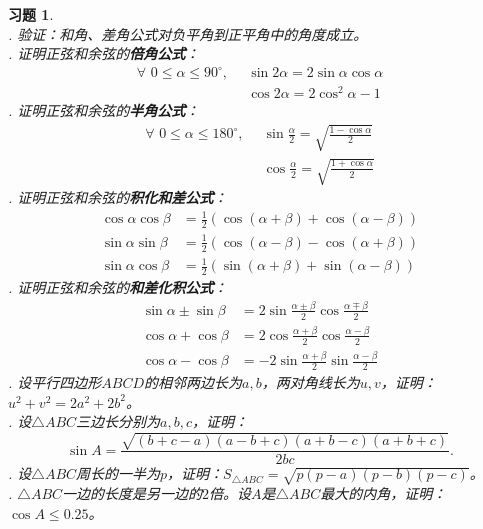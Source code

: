 \documentclass[12pt,UTF8]{ctexbook}
\newtheorem{xt}{习题}[section]
\begin{document}
\begin{xt}\label{xt:2-4-10}
    \mbox{} \\
    . 验证：和角、差角公式对负平角到正平角中的角度成立。 \\
    . 证明正弦和余弦的\textbf{倍角公式}：
    \begin{align*}
        \forall \,\, 0 \leqslant \alpha \leqslant 90^\circ , \,\,\, & \sin 2\alpha = 2\sin \alpha \cos \alpha  \\
        & \cos 2\alpha = 2\cos^2 \alpha - 1  
    \end{align*}
    . 证明正弦和余弦的\textbf{半角公式}：
    \begin{align*}
        \forall \,\, 0 \leqslant \alpha \leqslant 180^\circ , \,\,\, & \sin \frac{\alpha}{2} = \sqrt{\frac{1 - \cos \alpha}{2}}   \\
        & \cos \frac{\alpha}{2} = \sqrt{\frac{1 + \cos \alpha}{2}} 
    \end{align*}
    . 证明正弦和余弦的\textbf{积化和差公式}：
    \begin{align*}
        \cos \alpha \cos \beta &= \frac12 (\cos (\alpha + \beta) + \cos (\alpha - \beta))  \\
        \sin \alpha \sin \beta &= \frac12 (\cos (\alpha - \beta) - \cos (\alpha + \beta))  \\
        \sin \alpha \cos \beta &= \frac12 (\sin (\alpha + \beta) + \sin (\alpha - \beta))  
    \end{align*}
    . 证明正弦和余弦的\textbf{和差化积公式}：
    \begin{align*}
        \sin \alpha \pm \sin \beta &= 2\sin \frac{\alpha \pm \beta}{2} \cos \frac{\alpha \mp \beta}{2}  \\
        \cos \alpha + \cos \beta &= 2\cos \frac{\alpha + \beta}{2} \cos \frac{\alpha - \beta}{2}  \\
        \cos \alpha - \cos \beta &= -2\sin \frac{\alpha + \beta}{2} \sin \frac{\alpha - \beta}{2}  
    \end{align*}
    . 设平行四边形$ABCD$的相邻两边长为$a,b$，两对角线长为$u,v$，证明：$u^2 + v^2 = 2a^2 + 2b^2$。 \\
    . 设$\triangle ABC$三边长分别为$a,b,c$，证明：
    $$\sin A = \frac{\sqrt{(b+c-a)(a-b+c)(a+b-c)(a+b+c)}}{2bc}.$$ 
    . 设$\triangle ABC$周长的一半为$p$，证明：$S_{\triangle ABC} = \sqrt{p(p-a)(p-b)(p-c)}$。 \\
    . $\triangle ABC$一边的长度是另一边的$2$倍。设$A$是$\triangle ABC$最大的内角，证明：$\cos A \leqslant 0.25$。

\end{xt}
\end{document}
